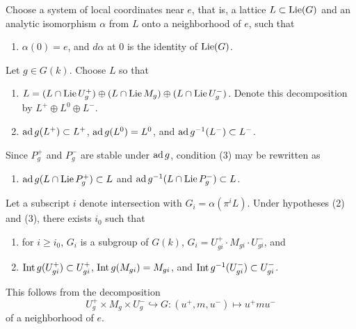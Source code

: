 
Choose a system of local coordinates near \(e\), that is, a lattice
\(L\subset\operatorname{Lie}(G)\) and an analytic isomorphism \(\alpha\) from \(L\) onto a
neighborhood of \(e\), such that

\begin{enumerate}[label=(\arabic*)]
\item \(\alpha(0)=e\), and \(d\alpha\) at \(0\) is the identity of \(\operatorname{Lie}(G)\).
\end{enumerate}

Let \(g\in G(k)\). Choose \(L\) so that

\begin{enumerate}[label=(\arabic*),start=2]
\item
  \(L=(L\cap\operatorname{Lie} U_g^{+})\oplus(L\cap\operatorname{Lie} M_g)\oplus
  (L\cap\operatorname{Lie} U_g^{-})\). Denote this decomposition by
  \(L^{+}\oplus L^{0}\oplus L^{-}\).
\item
  \(\operatorname{ad} g(L^{+})\subset L^{+}\), \(\operatorname{ad} g(L^{0})=L^{0}\), and
  \(\operatorname{ad} g^{-1}(L^{-})\subset L^{-}\).
\end{enumerate}

Since \(P_g^{+}\) and \(P_g^{-}\) are stable under \(\operatorname{ad} g\), condition (3)
may be rewritten as

\begin{enumerate}
\item[(3')]
  \(\operatorname{ad} g(L\cap\operatorname{Lie} P_g^{+})\subset L\) and
  \(\operatorname{ad} g^{-1}(L\cap\operatorname{Lie} P_g^{-})\subset L\).
\end{enumerate}

Let a subscript \(i\) denote intersection with
\(G_i=\alpha(\pi^{i}L)\). Under hypotheses (2) and (3), there exists \(i_0\)
such that

\begin{enumerate}[label=(\arabic*),start=4]
\item for \(i\geq i_0\), \(G_i\) is a subgroup of \(G(k)\),
  \(G_i=U_{gi}^{+}\cdot M_{gi}\cdot U_{gi}^{-}\), and
\item \(\operatorname{Int} g(U_{gi}^{+})\subset U_{gi}^{+}\),
  \(\operatorname{Int} g(M_{gi})=M_{gi}\), and
  \(\operatorname{Int} g^{-1}(U_{gi}^{-})\subset U_{gi}^{-}\).
\end{enumerate}

This follows from the decomposition
\[
  U_g^{+}\times M_g\times U_g^{-}\hookrightarrow G:
  (u^{+},m,u^{-})\longmapsto u^{+}mu^{-}
\]
of a neighborhood of \(e\).

